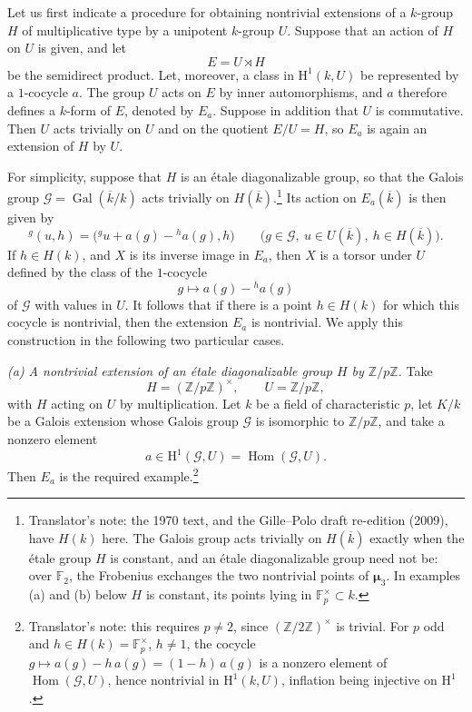 

Let us first indicate a procedure for obtaining nontrivial
extensions of a \(k\)-group \(H\) of multiplicative type by a
unipotent \(k\)-group \(U\).  Suppose that an action of \(H\) on
\(U\) is given, and let
\[
  E=U\rtimes H
\]
be the semidirect product.  Let, moreover, a class in
\(\mathrm H^1(k,U)\) be represented by a \(1\)-cocycle \(a\).
The group \(U\) acts on \(E\) by inner automorphisms, and \(a\)
therefore defines a \(k\)-form of \(E\), denoted by \(E_a\).
Suppose in addition that \(U\) is commutative.  Then \(U\) acts
trivially on \(U\) and on the quotient \(E/U=H\), so \(E_a\) is
again an extension of \(H\) by \(U\).

For simplicity, suppose that \(H\) is an étale diagonalizable
group, so that the Galois group
\(\mathscr G=\operatorname{Gal}(\overline{k}/k)\) acts trivially
on \(H(\overline{k})\).\footnote{Translator's note: the 1970 text, and the Gille--Polo draft re-edition (2009), have
\(H(k)\) here. The Galois group acts trivially on \(H(\overline{k})\) exactly when the
étale group \(H\) is constant, and an étale diagonalizable group need not be: over
\(\mathbb F_2\), the Frobenius exchanges the two nontrivial points of
\(\boldsymbol\mu_3\). In examples (a) and (b) below \(H\) is constant, its points lying
in \(\mathbb F_p^\times\subset k\).}  Its action on \(E_a(\overline{k})\) is
then given by
\[
  {}^g(u,h)
  =\bigl({}^g u+a(g)-{}^h a(g),h\bigr)
  \qquad
  \bigl(g\in\mathscr G,\ u\in U(\overline{k}),\
        h\in H(\overline{k})\bigr).
\]
If \(h\in H(k)\), and \(X\) is its inverse image in \(E_a\), then
\(X\) is a torsor under \(U\) defined by the class of the
\(1\)-cocycle
\[
  g\longmapsto a(g)-{}^h a(g)
\]
of \(\mathscr G\) with values in \(U\).  It follows that if there
is a point \(h\in H(k)\) for which this cocycle is nontrivial,
then the extension \(E_a\) is nontrivial.  We apply this
construction in the following two particular cases.

\smallskip
\noindent
\emph{(a) A nontrivial extension of an étale diagonalizable group
\(H\) by \(\mathbb Z/p\mathbb Z\).}
Take
\[
  H=(\mathbb Z/p\mathbb Z)^\times,
  \qquad U=\mathbb Z/p\mathbb Z,
\]
with \(H\) acting on \(U\) by multiplication.  Let \(k\) be a
field of characteristic \(p\), let \(K/k\) be a Galois extension
whose Galois group \(\mathscr G\) is isomorphic to
\(\mathbb Z/p\mathbb Z\), and take a nonzero element
\[
  a\in\mathrm H^1(\mathscr G,U)
   =\operatorname{Hom}(\mathscr G,U).
\]
Then \(E_a\) is the required example.\footnote{Translator's note: this requires \(p\ne2\), since
\((\mathbb Z/2\mathbb Z)^\times\) is trivial. For \(p\) odd and \(h\in H(k)=\mathbb F_p^\times\),
\(h\ne1\), the cocycle \(g\mapsto a(g)-h\,a(g)=(1-h)\,a(g)\) is a nonzero element of
\(\operatorname{Hom}(\mathscr G,U)\), hence nontrivial in \(\mathrm H^1(k,U)\), inflation being
injective on \(\mathrm H^1\).}

